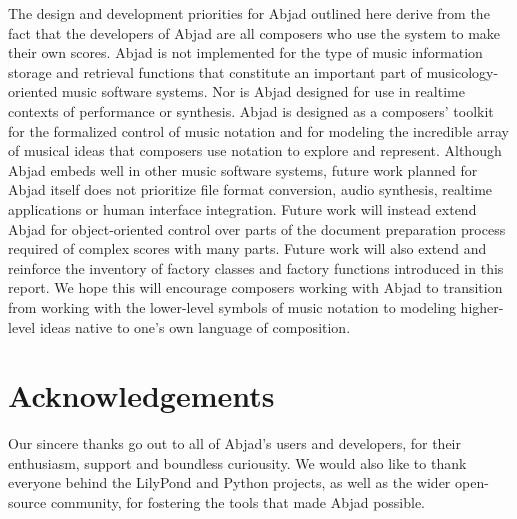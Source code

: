 \documentclass{article}
\begin{document}
The design and development priorities for Abjad outlined here derive from the
fact that the developers of Abjad are all composers who use the system to make
their own scores. Abjad is not implemented for the type of music information
storage and retrieval functions that constitute an important part of
musicology-oriented music software systems. Nor is Abjad designed for use in
realtime contexts of performance or synthesis. Abjad is designed as a
composers' toolkit for the formalized control of music notation and for
modeling the incredible array of musical ideas that composers use notation to
explore and represent. Although Abjad embeds well in other music software
systems, future work planned for Abjad itself does not prioritize file format
conversion, audio synthesis, realtime applications or human interface
integration. Future work will instead extend Abjad for object-oriented control
over parts of the document preparation process required of complex scores with
many parts. Future work will also extend and reinforce the inventory of factory
classes and factory functions introduced in this report. We hope this will
encourage composers working with Abjad to transition from working with the
lower-level symbols of music notation to modeling higher-level ideas native to
one's own language of composition.

\section{Acknowledgements} \label{sec:acknowledgements}

Our sincere thanks go out to all of Abjad's users and developers, for their
enthusiasm, support and boundless curiousity. We would also like to thank
everyone behind the LilyPond and Python projects, as well as the wider
open-source community, for fostering the tools that made Abjad possible.


\end{document}
